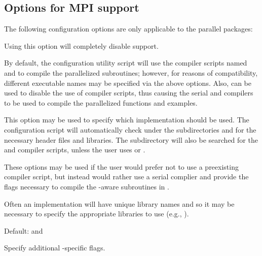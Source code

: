 \subsection*{Options for MPI support}

\noindent The following configuration options are only applicable to the parallel
{\sundials} packages:

\begin{config}
  
\item {}

  Using this option will completely disable {\mpi} support.

\item {}
\item {}

  By default, the configuration utility script will use the {\mpi} compiler
  scripts named  and  to compile the parallelized
  {\sundials} subroutines; however, for reasons of compatibility, different
  executable names may be specified via the above options. Also, 
  can be used to disable the use of {\mpi} compiler scripts, thus causing
  the serial {\C} and {\F} compilers to be used to compile the parallelized
  {\sundials} functions and examples.

\item {}

  This option may be used to specify which {\mpi} implementation should be used.
  The {\sundials} configuration script will automatically check under the
  subdirectories  and  for the necessary
  header files and libraries. The subdirectory  will also be
  searched for the {\C} and {\F} {\mpi} compiler scripts, unless the user uses
   or .

\item {}
\item {}
\item {}

  These options may be used if the user would prefer not to use a preexisting
  {\mpi} compiler script, but instead would rather use a serial complier and
  provide the flags necessary to compile the {\mpi}-aware subroutines in
  {\sundials}.

  Often an {\mpi} implementation will have unique library names and so it may
  be necessary to specify the appropriate libraries to use (e.g.,
  ).

  Default:  and 

\item {}

  Specify additional {\mpi}-specific flags.

\end{config}


